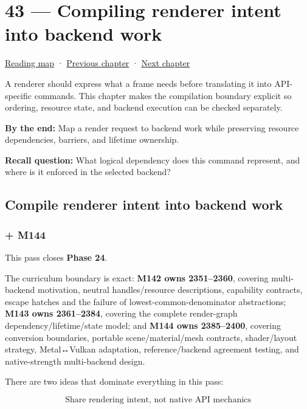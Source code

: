 \hypertarget{06-engine-ii-ch043}{}
\section{43 --- Compiling renderer intent into backend work}\label{compiling-renderer-intent-into-backend-work}

\href{Chapter\%20Edition/03\%20-\%20Game\%20Engine/00\%20-\%20Reading\%20Map}{Reading map} · \hyperref[06-engine-ii-ch042]{Previous chapter} · \hyperref[06-engine-ii-ch044]{Next chapter}

A renderer should express what a frame needs before translating it into API-specific commands. This chapter makes the compilation boundary explicit so ordering, resource state, and backend execution can be checked separately.

\textbf{By the end:} Map a render request to backend work while preserving resource dependencies, barriers, and lifetime ownership.

\textbf{Recall question:} What logical dependency does this command represent, and where is it enforced in the selected backend?

\subsection{Compile renderer intent into backend work}\label{compile-renderer-intent-into-backend-work}

\subsubsection{+ M144}\label{m144}

This pass closes \textbf{Phase 24}.

The curriculum boundary is exact: \textbf{M142 owns 2351--2360}, covering multi-backend motivation, neutral handles/resource descriptions, capability contracts, escape hatches and the failure of lowest-common-denominator abstractions; \textbf{M143 owns 2361--2384}, covering the complete render-graph dependency/lifetime/state model; and \textbf{M144 owns 2385--2400}, covering conversion boundaries, portable scene/material/mesh contracts, shader/layout strategy, Metal↔Vulkan adaptation, reference/backend agreement testing, and native-strength multi-backend design.

There are two ideas that dominate everything in this pass:

\[
\boxed{
\text{Share rendering intent, not native API mechanics}
}
\]

